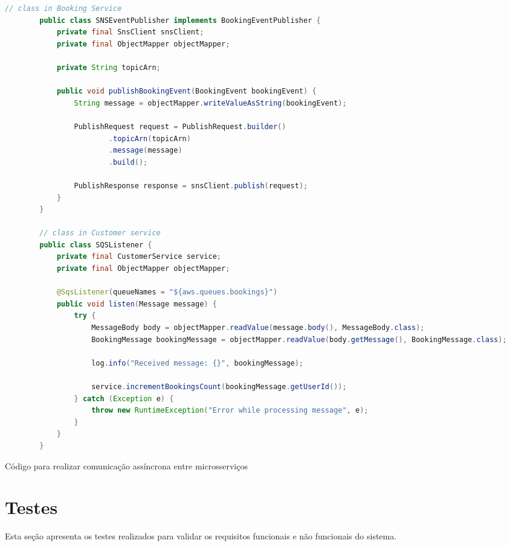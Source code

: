 \begin{codigo}[H]
    \begin{lstlisting}[language=Java]
        // class in Booking Service
        public class SNSEventPublisher implements BookingEventPublisher {
            private final SnsClient snsClient;
            private final ObjectMapper objectMapper;

            private String topicArn;

            public void publishBookingEvent(BookingEvent bookingEvent) {
                String message = objectMapper.writeValueAsString(bookingEvent);

                PublishRequest request = PublishRequest.builder()
                        .topicArn(topicArn)
                        .message(message)
                        .build();

                PublishResponse response = snsClient.publish(request);
            }
        }

        // class in Customer service
        public class SQSListener {
            private final CustomerService service;
            private final ObjectMapper objectMapper;

            @SqsListener(queueNames = "${aws.queues.bookings}")
            public void listen(Message message) {
                try {
                    MessageBody body = objectMapper.readValue(message.body(), MessageBody.class);
                    BookingMessage bookingMessage = objectMapper.readValue(body.getMessage(), BookingMessage.class);

                    log.info("Received message: {}", bookingMessage);

                    service.incrementBookingsCount(bookingMessage.getUserId());
                } catch (Exception e) {
                    throw new RuntimeException("Error while processing message", e);
                }
            }
        }

    \end{lstlisting}
    \caption{Código para realizar comunicação assíncrona entre microsserviços}
    \label{cod:comunicacao-assincrona}
\end{codigo}

\section{Testes}
Esta seção apresenta os testes realizados para validar os requisitos funcionais e não funcionais do sistema.

